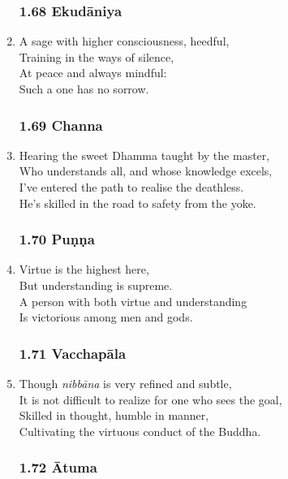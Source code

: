 \documentclass[10pt, openany]{book}
\begin{document}
\begin{enumerate}
\subsubsection*{1.68 Ekudāniya}

\item A sage with higher consciousness, heedful,\\
Training in the ways of silence,\\
At peace and always mindful:\\
Such a one has no sorrow.

\subsubsection*{1.69 Channa}

\item Hearing the sweet Dhamma taught by the master,\\
Who understands all, and whose knowledge excels,\\
I’ve entered the path to realise the deathless.\\
He’s skilled in the road to safety from the yoke.

\subsubsection*{1.70 Puṇṇa}

\item Virtue is the highest here,\\
But understanding is supreme.\\
A person with both virtue and understanding\\
Is victorious among men and gods.

\subsubsection*{1.71 Vacchapāla}

\item Though \emph{nibbāna} is very refined and subtle,\\
It is not difficult to realize for one who sees the goal,\\
Skilled in thought, humble in manner,\\
Cultivating the virtuous conduct of the Buddha.

\subsubsection*{1.72 Ātuma}


\end{enumerate}
\end{document}
